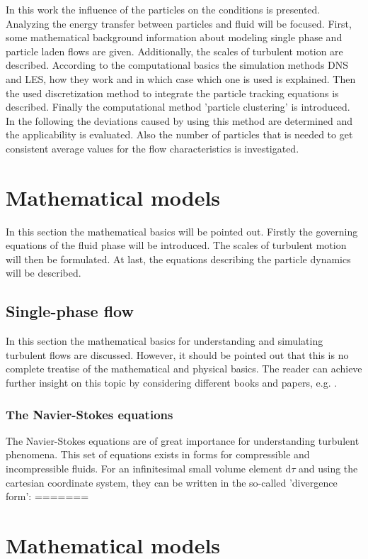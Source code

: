 \documentclass[11pt,a4paper,openany,oneside,parskip=half*]{article}
\begin{document}
In this work the influence of the particles on the conditions is presented. Analyzing the energy transfer between particles and fluid will be focused.  
\newline
First, some mathematical background information about modeling single phase and particle laden flows are given. 
Additionally, the scales of turbulent motion are described.
According to the computational basics the simulation methods DNS and LES, how they work and in which case which one is used is explained.
Then the used discretization method to integrate the particle tracking equations is described.     
Finally the computational method 'particle clustering' is introduced. 
In the following the deviations caused by using this method are determined and the applicability is evaluated.
Also the number of particles that is needed to get consistent average values for the flow characteristics is investigated.
\pagebreak
\section{Mathematical models}
In this section the mathematical basics will be pointed out. Firstly the governing equations of the fluid phase will be introduced. The scales of turbulent motion will then be formulated. At last, the equations describing the particle dynamics will be described. 
\subsection{Single-phase flow} %
In this section the mathematical basics for understanding and simulating turbulent flows are discussed. However, it should be pointed out that this is no
complete treatise of the mathematical and physical basics. The reader can achieve further insight on this topic by considering different books and papers, 
e.g. \cite{turbulentFlows}.
\newline
\subsubsection{The Navier-Stokes equations}
The Navier-Stokes equations are of great importance for understanding turbulent phenomena. This set of equations exists in forms for compressible and
incompressible fluids. For an infinitesimal small volume element $ \mathrm{d} \tau $ and using the cartesian coordinate system, 
they can be written in the so-called 'divergence form':
=======
\section{Mathematical models}%
\end{document}

